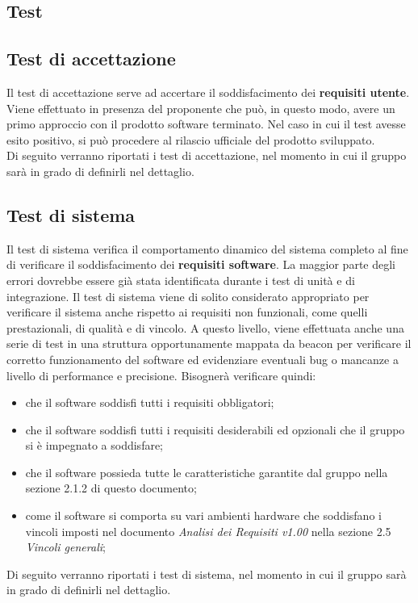 \documentclass[../PianoDiQualifica.tex]{subfiles}
\begin{document}
\begin{appendices}

\section{Test}
	\subsection{Test di accettazione}
	Il test di accettazione serve ad accertare il soddisfacimento dei \textbf{requisiti utente}. Viene effettuato in presenza del proponente che può, in questo modo, avere un primo approccio con il prodotto software terminato. Nel caso in cui il test avesse esito positivo, si può procedere al rilascio ufficiale del prodotto sviluppato.\\
	Di seguito verranno riportati i test di accettazione, nel momento in cui il gruppo sarà in grado di definirli nel dettaglio.
	\subsection{Test di sistema}
	Il test di sistema verifica il comportamento dinamico del sistema completo al fine di verificare il soddisfacimento dei \textbf{requisiti software}. La maggior parte degli errori dovrebbe essere già stata identificata durante i test di unità e di integrazione. Il test di sistema viene di solito considerato appropriato per verificare il sistema anche rispetto ai requisiti non funzionali, come quelli prestazionali, di qualità e di vincolo. A questo livello, viene effettuata anche una serie di test in una struttura opportunamente mappata da beacon per verificare il corretto funzionamento del software ed evidenziare eventuali bug o mancanze a livello di performance e precisione. Bisognerà verificare quindi:
	\begin{itemize}
		\item che il software soddisfi tutti i requisiti obbligatori;
		\item che il software soddisfi tutti i requisiti desiderabili ed opzionali che il gruppo si è impegnato a soddisfare;
		\item che il software possieda tutte le caratteristiche garantite dal gruppo nella sezione 2.1.2 di questo documento;
		\item come il software si comporta su vari ambienti hardware che soddisfano i vincoli imposti nel documento \textit{Analisi dei Requisiti v1.00} nella sezione 2.5 \textit{Vincoli generali};
	\end{itemize}
	Di seguito verranno riportati i test di sistema, nel momento in cui il gruppo sarà in grado di definirli nel dettaglio.
\end{appendices}
\end{document}
